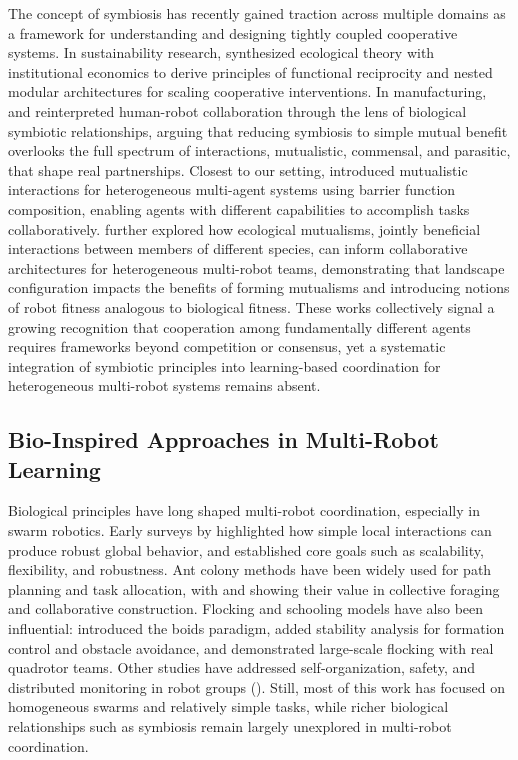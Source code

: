 \documentclass[Afour,sageh,times]{sagej}
\begin{document}
The concept of symbiosis has recently gained traction across multiple domains as a framework for understanding and designing tightly coupled cooperative systems. In sustainability research, \cite{cao2025designing} synthesized ecological theory with institutional economics to derive principles of functional reciprocity and nested modular architectures for scaling cooperative interventions. In manufacturing, \cite{barravecchia2023redefining} and \cite{wu2026empowering} reinterpreted human-robot collaboration through the lens of biological symbiotic relationships, arguing that reducing symbiosis to simple mutual benefit overlooks the full spectrum of interactions, mutualistic, commensal, and parasitic, that shape real partnerships. Closest to our setting, \cite{nguyen2023mutualistic} introduced mutualistic interactions for heterogeneous multi-agent systems using barrier function composition, enabling agents with different capabilities to accomplish tasks collaboratively. \cite{nguyen2025mutualisms} further explored how ecological mutualisms, jointly beneficial interactions between members of different species, can inform collaborative architectures for heterogeneous multi-robot teams, demonstrating that landscape configuration impacts the benefits of forming mutualisms and introducing notions of robot fitness analogous to biological fitness. These works collectively signal a growing recognition that cooperation among fundamentally different agents requires frameworks beyond competition or consensus, yet a systematic integration of symbiotic principles into learning-based coordination for heterogeneous multi-robot systems remains absent.

\subsection{Bio-Inspired Approaches in Multi-Robot Learning}
Biological principles have long shaped multi-robot coordination, especially in swarm robotics. Early surveys by \cite{sahin2005Swarm} highlighted how simple local interactions can produce robust global behavior, and established core goals such as scalability, flexibility, and robustness. Ant colony methods have been widely used for path planning and task allocation, with \cite{dorigo2019Ant} and \cite{garnier2007Biological} showing their value in collective foraging and collaborative construction. Flocking and schooling models have also been influential: \cite{reynolds1987Flocks} introduced the boids paradigm, \cite{tanner2007Flocking} added stability analysis for formation control and obstacle avoidance, and \cite{vasarhelyi2018Optimized} demonstrated large-scale flocking with real quadrotor teams. Other studies have addressed self-organization, safety, and distributed monitoring in robot groups (\cite{trianni2006Selforganisation, winfield2006Safety, fagiolini2024Distributed}). Still, most of this work has focused on homogeneous swarms and relatively simple tasks, while richer biological relationships such as symbiosis remain largely unexplored in multi-robot coordination.
\end{document}
